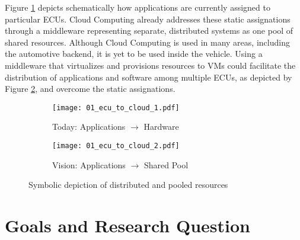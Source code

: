         \noindent Figure \ref{fig:ecu_pooling_today} depicts schematically how applications are currently assigned to particular \acp{ECU}.
        Cloud Computing already addresses these static assignations through a middleware representing separate, distributed systems as one pool of shared resources.
        Although Cloud Computing is used in many areas, including the automotive backend, it is yet to be used inside the vehicle.
        Using a middleware that virtualizes and provisions resources to \acp{VM} could facilitate the distribution of applications and software among multiple \acp{ECU}, as depicted by Figure \ref{fig:ecu_pooling_vision}, and overcome the static assignations.
        
        \begin{figure}[ht]
        \centering
            \begin{subfigure}[b]{0.45\textwidth}
                \centering
                \texttt{[image: 01\_ecu\_to\_cloud\_1.pdf]}
                \caption{Today: Applications $\to$ Hardware}
                \label{fig:ecu_pooling_today}
            \end{subfigure}
            \hfill
            \begin{subfigure}[b]{0.45\textwidth}
                \centering
                \texttt{[image: 01\_ecu\_to\_cloud\_2.pdf]}
                \caption{Vision: Applications $\to$ Shared Pool}
                \label{fig:ecu_pooling_vision}
            \end{subfigure}
            \caption{Symbolic depiction of distributed and pooled resources}
            \label{figure:ecu_pooling}
        \end{figure}

           
    \section{Goals and Research Question}
    \label{section:problem}
        
